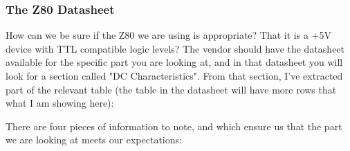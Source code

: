 \subsubsection{The Z80 Datasheet}

How can we be sure if the Z80 we are using is appropriate? That it is a +5V device with TTL compatible logic levels? The vendor should have the datasheet available for the specific part you are looking at, and in that datasheet you will look for a section called "DC Characteristics". From that section, I've extracted part of the relevant table (the table in the datasheet will have more rows that what I am showing here):



There are four pieces of information to note, and which ensure us that the part we are looking at meets our expectations:

